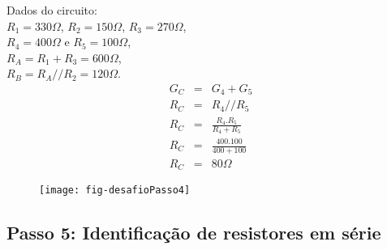 \begin{minipage}{\linewidth}
  \centering
  \begin{minipage}{0.45\linewidth}
    Dados do circuito: \\
                $R_1 = 330\Omega$,
                $R_2 = 150\Omega$,
                $R_3 = 270\Omega$, \\
                $R_4 = 400\Omega$ e
                $R_5 = 100\Omega$,\\
                $R_A = R_1 + R_3 = 600\Omega$, \\
                $R_B = R_A // R_2 = 120\Omega$.
        \begin{eqnarray}
         G_C & = & G_4 + G_5 \nonumber\\
         R_C & = & R_4 // R_5 \nonumber\\
         R_C & = & \frac{R_4 . R_5}{R_4 + R_5} \nonumber\\
         R_C & = & \frac{400 . 100}{400 + 100} \nonumber\\
         R_C & = & 80\Omega \nonumber
        \end{eqnarray}

  \end{minipage}
  \hspace{0.05\linewidth}
  \begin{minipage}{0.45\linewidth}
    \begin{figure}[H]
      \centering
      \texttt{[image: fig-desafioPasso4]}
    \end{figure}
  \end{minipage}
\end{minipage}






\subsection{Passo 5: Identificação de resistores em série}

